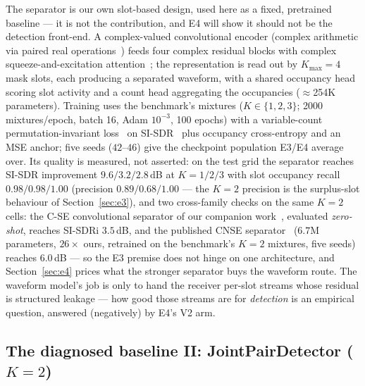 \documentclass[journal]{IEEEtran}
\begin{document}
The separator is our own slot-based design, used here as a fixed,
pretrained baseline --- it is not the contribution, and E4 will show it
should not be the detection front-end. A complex-valued convolutional
encoder (complex arithmetic via paired real
operations~\cite{trabelsi2018complex}) feeds four complex residual
blocks with complex squeeze-and-excitation
attention~\cite{hu2018senet}; the representation is read out by
$K_{\max}{=}4$ mask slots, each producing a separated waveform, with a
shared occupancy head scoring slot activity and a count head
aggregating the occupancies ($\approx$254K parameters). Training uses
the benchmark's mixtures ($K \in \{1,2,3\}$; 2000 mixtures/epoch,
batch 16, Adam $10^{-3}$, 100 epochs) with a variable-count
permutation-invariant loss~\cite{kolbaek2017pit} on SI-SDR~\cite{leroux2019sdr} plus
occupancy cross-entropy and an MSE anchor; five seeds ($42$--$46$)
give the checkpoint population E3/E4 average over. Its quality is
measured, not asserted: on the test grid the separator reaches
SI-SDR improvement $9.6/3.2/2.8$\,dB at $K{=}1/2/3$ with slot
occupancy recall $0.98/0.98/1.00$ (precision $0.89/0.68/1.00$ --- the
$K{=}2$ precision is the surplus-slot behaviour of
Section~\ref{sec:e3}), and two cross-family checks on the same $K{=}2$
cells: the C-SE convolutional separator of our companion work~\cite{nong2026companion},
evaluated \emph{zero-shot}, reaches SI-SDRi $3.5$\,dB, and the
published CNSE separator~\cite{hou2022single} ($6.7$M parameters,
$26\times$ ours, retrained on the benchmark's $K{=}2$ mixtures, five
seeds) reaches $6.0$\,dB --- so the E3 premise does not hinge on one
architecture, and Section~\ref{sec:e4} prices what the stronger
separator buys the waveform route. The waveform
model's job is only
to hand the receiver per-slot streams whose residual is structured
leakage --- how good those streams are for \emph{detection} is an
empirical question, answered (negatively) by E4's V2 arm.

\subsection{The diagnosed baseline II: JointPairDetector ($K{=}2$)}
\label{sec:method-joint}
\end{document}
